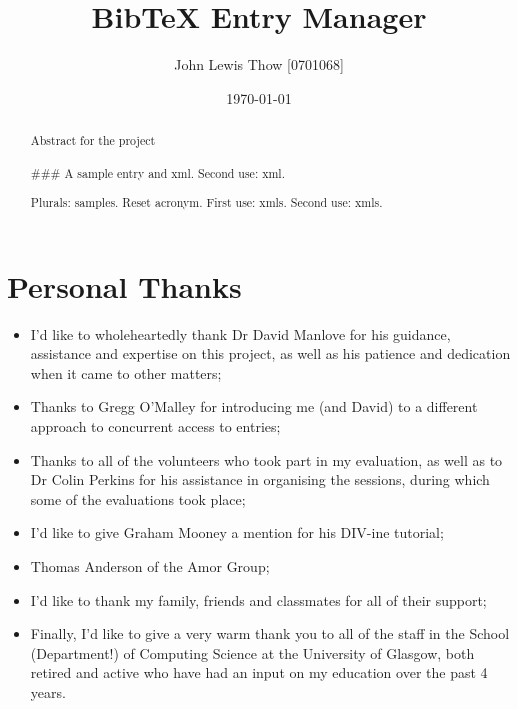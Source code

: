 \documentclass{l4proj}
\newcommand{\BibTeX}{B{\sc ib}\TeX}
\newcommand{\bibtex}{\BibTeX}
\newcommand{\revisit}{\#\#\#}
\begin{document}
\title{\bibtex{} Entry Manager}
\author{John Lewis Thow [0701068]}
\date{\today}
\maketitle




\begin{abstract}
Abstract for the project\\\\

\revisit
A \gls{sample} entry and \gls{xml}. Second use: \gls{xml}.

Plurals: \glspl{sample}. Reset acronym.
First use: \glspl{xml}. Second use: \glspl{xml}.

\end{abstract}


\newpage
\section*{Personal Thanks}
\begin{itemize}
\item I'd like to wholeheartedly thank Dr David Manlove for his guidance, assistance and expertise on this project, as well as his patience and dedication when it came to other matters;
\item Thanks to Gregg O'Malley for introducing me (and David) to a different approach to concurrent access to entries;
\item Thanks to all of the volunteers who took part in my evaluation, as well as to Dr Colin Perkins for his assistance in organising the sessions, during which some of the evaluations took place;
\item I'd like to give Graham Mooney a mention for his DIV-ine tutorial;
\item Thomas Anderson of the Amor Group;
\item I'd like to thank my family, friends and classmates for all of their support;
\item Finally, I'd like to give a very warm thank you to all of the staff in the School (Department!) of Computing Science at the University of Glasgow, both retired and active who have had an input on my education over the past 4 years.
\end{itemize}
\end{document}
